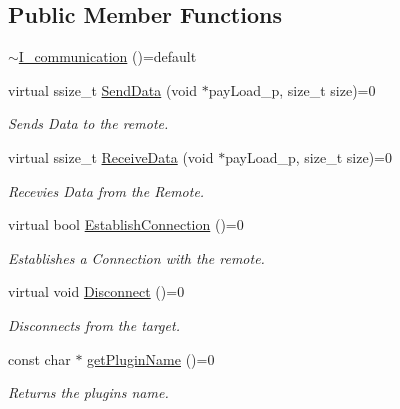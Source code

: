 \subsection*{Public Member Functions}
\begin{DoxyCompactItemize}
\item 
\mbox{\hyperlink{classCommunication_1_1I__communication_a99bb16b4f894003f22b1b1cfecd95217}{$\sim$\+I\+\_\+communication}} ()=default
\item 
virtual ssize\+\_\+t \mbox{\hyperlink{classCommunication_1_1I__communication_ad25474a90b1bf2789e9ab6ff57b3406e}{Send\+Data}} (void $\ast$pay\+Load\+\_\+p, size\+\_\+t size)=0
\begin{DoxyCompactList}\small\item\em Sends Data to the remote. \end{DoxyCompactList}\item 
virtual ssize\+\_\+t \mbox{\hyperlink{classCommunication_1_1I__communication_a48699762983e2bc64cc1e0642bf2e235}{Receive\+Data}} (void $\ast$pay\+Load\+\_\+p, size\+\_\+t size)=0
\begin{DoxyCompactList}\small\item\em Recevies Data from the Remote. \end{DoxyCompactList}\item 
virtual bool \mbox{\hyperlink{classCommunication_1_1I__communication_a2e602d8d262f409c36d4170898c61023}{Establish\+Connection}} ()=0
\begin{DoxyCompactList}\small\item\em Establishes a Connection with the remote. \end{DoxyCompactList}\item 
\mbox{\label{classCommunication_1_1I__communication_a083b6e95a487e3e8bdd64222d226dbc9}} 
virtual void \mbox{\hyperlink{classCommunication_1_1I__communication_a083b6e95a487e3e8bdd64222d226dbc9}{Disconnect}} ()=0
\begin{DoxyCompactList}\small\item\em Disconnects from the target. \end{DoxyCompactList}\item 
const char $\ast$ \mbox{\hyperlink{classCommunication_1_1I__communication_a5ef61375a8126f29c38cc1aa17339563}{get\+Plugin\+Name}} ()=0
\begin{DoxyCompactList}\small\item\em Returns the plugins name. \end{DoxyCompactList}\item 

\end{DoxyCompactItemize}
